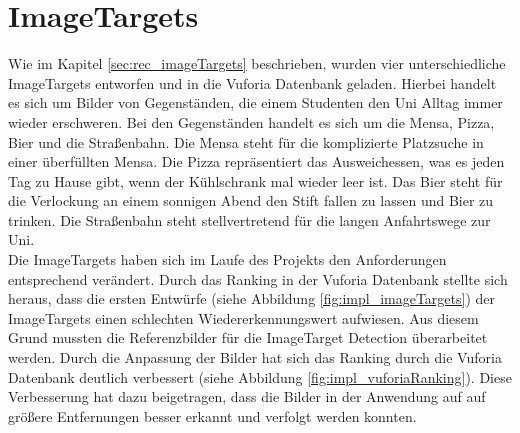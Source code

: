 \section{ImageTargets}
Wie im Kapitel  \ref{sec:rec_imageTargets} beschrieben, wurden vier unterschiedliche ImageTargets entworfen und in die Vuforia Datenbank geladen. Hierbei handelt es sich um Bilder von Gegenständen, die einem Studenten den Uni Alltag immer wieder erschweren. Bei den Gegenständen handelt es sich um die Mensa, Pizza, Bier und die Straßenbahn. Die Mensa steht für die komplizierte Platzsuche in einer überfüllten Mensa. Die Pizza repräsentiert das Ausweichessen, was es jeden Tag zu Hause gibt, wenn der Kühlschrank mal wieder leer ist. Das Bier steht für die Verlockung an einem sonnigen Abend den Stift fallen zu lassen und Bier zu trinken. Die Straßenbahn steht stellvertretend für die langen Anfahrtswege zur Uni.\\
Die ImageTargets haben sich im Laufe des Projekts den Anforderungen entsprechend verändert. Durch das Ranking in der Vuforia Datenbank stellte sich heraus, dass die ersten Entwürfe (siehe Abbildung \ref{fig:impl_imageTargets}) der ImageTargets einen schlechten Wiedererkennungswert aufwiesen. Aus diesem Grund mussten die Referenzbilder für die ImageTarget Detection überarbeitet werden. Durch die Anpassung der Bilder hat sich das Ranking durch die Vuforia Datenbank deutlich verbessert (siehe Abbildung \ref{fig:impl_vuforiaRanking}). Diese Verbesserung hat dazu beigetragen, dass die Bilder in der Anwendung auf auf größere Entfernungen besser erkannt und verfolgt werden konnten.
